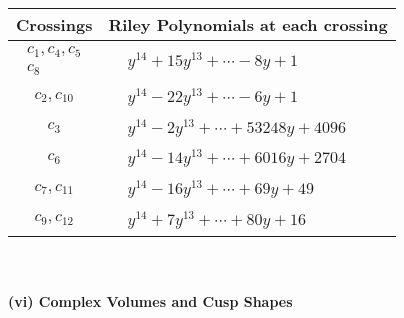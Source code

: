 \documentclass[1p]{elsarticle_modified}
\theoremstyle{definition}
\begin{document}
\begin{tabular}{m{50pt}|m{274pt}}
Crossings & \hspace{64pt}Riley Polynomials at each crossing \\
\hline $$\begin{aligned}c_{1},c_{4},c_{5}\\c_{8}\end{aligned}$$&$\begin{aligned}
&y^{14}+15 y^{13}+\cdots-8 y+1
\end{aligned}$\\
\hline $$\begin{aligned}c_{2},c_{10}\end{aligned}$$&$\begin{aligned}
&y^{14}-22 y^{13}+\cdots-6 y+1
\end{aligned}$\\
\hline $$\begin{aligned}c_{3}\end{aligned}$$&$\begin{aligned}
&y^{14}-2 y^{13}+\cdots+53248 y+4096
\end{aligned}$\\
\hline $$\begin{aligned}c_{6}\end{aligned}$$&$\begin{aligned}
&y^{14}-14 y^{13}+\cdots+6016 y+2704
\end{aligned}$\\
\hline $$\begin{aligned}c_{7},c_{11}\end{aligned}$$&$\begin{aligned}
&y^{14}-16 y^{13}+\cdots+69 y+49
\end{aligned}$\\
\hline $$\begin{aligned}c_{9},c_{12}\end{aligned}$$&$\begin{aligned}
&y^{14}+7 y^{13}+\cdots+80 y+16
\end{aligned}$\\
\hline
\end{tabular}\\~\\
\newpage\flushleft \textbf{(vi) Complex Volumes and Cusp Shapes}
\end{document}
